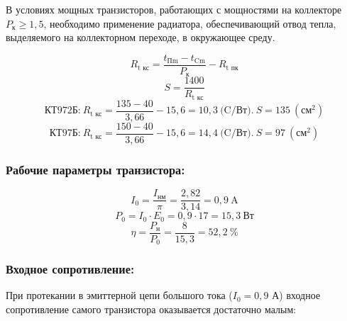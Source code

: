 В условиях мощных транзисторов, работающих с мощностями на коллекторе $P_{\text{к}} \geq 1,5$, необходимо применение радиатора, обеспечивающий отвод тепла, выделяемого на коллекторном переходе, в окружающее среду.

\begin{equation}
\label{eq:equation2_12}
 R_{\text{t кс}} = \dfrac{t_{\text{Пm}} - t_{\text{Cm}}}{P_{\text{к}}} - R_{\text{t пк}}
\end{equation}
\begin{equation}
\label{eq:equation2_13}
 S = \dfrac{1400}{R_{\text{t кс}}}
\end{equation}
\begin{equation}
\label{eq:equation2_14}
 \text{КТ972Б:}~R_{\text{t кс}} = \dfrac{135-40}{3,66} - 15,6 = 10,3~\text{(C/Вт)}.~S = 135~(\text{см}^2)
\end{equation}
\begin{equation}
\label{eq:equation2_15}
 \text{КТ97Б:}~R_{\text{t кс}} = \dfrac{150-40}{3,66} - 15,6 = 14,4~\text{(C/Вт)}.~S = 97~(\text{см}^2)
\end{equation}

\subsubsection{Рабочие параметры транзистора:}

\begin{equation}
\label{eq:equation2_16}
 I_0 = \dfrac{I_{\text{нм}}}{\pi} = \dfrac{2,82}{3,14} = 0,9~\text{A}
\end{equation}
\begin{equation}
\label{eq:equation2_17}
 P_0 = I_0 \cdot E_0 = 0,9 \cdot 17 = 15,3~\text{Вт}
\end{equation}
\begin{equation}
\label{eq:equation2_18}
 \eta = \dfrac{P_{\text{н}}}{P_0} = \dfrac{8}{15,3} = 52,2~\text{\%}
\end{equation}

\subsubsection{Входное сопротивление:}

При протекании в эмиттерной цепи большого тока ($I_0 = 0,9$ А) входное сопротивление самого транзистора оказывается достаточно малым: 

\begin{equation}
\label{eq:equation2_19}
  
\end{equation}

